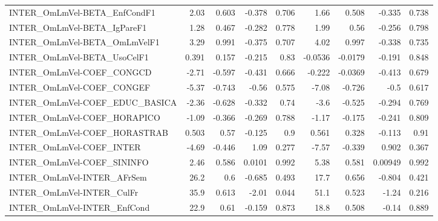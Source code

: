 \begin{tabular}{lrrrrrrrr}
INTER\_OmLmVel-BETA\_EnfCondF1          &        2.03 &        0.603 &  -0.378 &    0.706 &       1.66 &       0.508 &       -0.335 &         0.738 \\
INTER\_OmLmVel-BETA\_IgPareF1           &        1.28 &        0.467 &  -0.282 &    0.778 &       1.99 &        0.56 &       -0.256 &         0.798 \\
INTER\_OmLmVel-BETA\_OmLmVelF1          &        3.29 &        0.991 &  -0.375 &    0.707 &       4.02 &       0.997 &       -0.338 &         0.735 \\
INTER\_OmLmVel-BETA\_UsoCelF1           &       0.391 &        0.157 &  -0.215 &     0.83 &    -0.0536 &     -0.0179 &       -0.191 &         0.848 \\
INTER\_OmLmVel-COEF\_CONGCD             &       -2.71 &       -0.597 &  -0.431 &    0.666 &     -0.222 &     -0.0369 &       -0.413 &         0.679 \\
INTER\_OmLmVel-COEF\_CONGEF             &       -5.37 &       -0.743 &   -0.56 &    0.575 &      -7.08 &      -0.726 &         -0.5 &         0.617 \\
INTER\_OmLmVel-COEF\_EDUC\_BASICA        &       -2.36 &       -0.628 &  -0.332 &     0.74 &       -3.6 &      -0.525 &       -0.294 &         0.769 \\
INTER\_OmLmVel-COEF\_HORAPICO           &       -1.09 &       -0.366 &  -0.269 &    0.788 &      -1.17 &      -0.175 &       -0.241 &         0.809 \\
INTER\_OmLmVel-COEF\_HORASTRAB          &       0.503 &         0.57 &  -0.125 &      0.9 &      0.561 &       0.328 &       -0.113 &          0.91 \\
INTER\_OmLmVel-COEF\_INTER              &       -4.69 &       -0.446 &    1.09 &    0.277 &      -7.57 &      -0.339 &        0.902 &         0.367 \\
INTER\_OmLmVel-COEF\_SININFO            &        2.46 &        0.586 &  0.0101 &    0.992 &       5.38 &       0.581 &      0.00949 &         0.992 \\
INTER\_OmLmVel-INTER\_AFrSem            &        26.2 &          0.6 &  -0.685 &    0.493 &       17.7 &       0.656 &       -0.804 &         0.421 \\
INTER\_OmLmVel-INTER\_CulFr             &        35.9 &        0.613 &   -2.01 &    0.044 &       51.1 &       0.523 &        -1.24 &         0.216 \\
INTER\_OmLmVel-INTER\_EnfCond           &        22.9 &         0.61 &  -0.159 &    0.873 &       18.8 &       0.508 &        -0.14 &         0.889 \\

\end{tabular}

